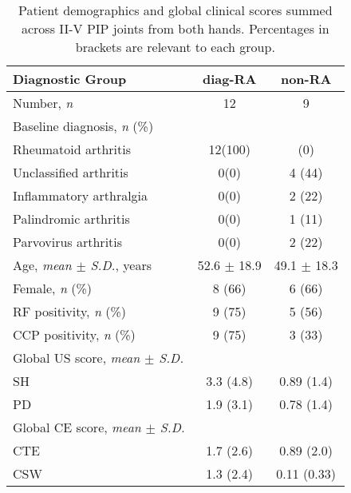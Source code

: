 \documentclass[twoside]{bhamthesis}
\theoremstyle{definition}
\begin{document}
\bgroup
\def\arraystretch{1.2}
\begin{table}[!ht]
  \footnotesize
\caption{Patient demographics and global clinical scores summed across II-V PIP joints from both hands. Percentages in brackets are relevant to each group.} 
\label{tab:participant_demographics}
\begin{center}       
\begin{tabular}{l c c} 
\hline
\textbf{Diagnostic Group} &\textbf{ diag-RA} & \textbf{non-RA} \\
\hline
Number, \textit{n} & 12 & 9 \\
Baseline diagnosis, \textit{n} (\%) \\
\hspace{3mm} Rheumatoid arthritis & 12\hspace{1mm}(100) & \hspace{1mm} \hspace{1mm}(0) \\
\hspace{3mm} Unclassified arthritis & 0\hspace{1mm}(0) & 4 \hspace{1mm}(44) \\
\hspace{3mm} Inflammatory arthralgia & 0\hspace{1mm}(0) & 2 \hspace{1mm}(22) \\
\hspace{3mm} Palindromic arthritis  & 0\hspace{1mm}(0) & 1 \hspace{1mm}(11) \\
\hspace{3mm} Parvovirus arthritis & 0\hspace{1mm}(0) & 2 \hspace{1mm}(22) \\
 Age, \textit{mean $\pm$ S.D.}, years & \hspace{1mm} 52.6 $\pm$ 18.9 & \hspace{1mm} 49.1 $\pm$ 18.3 \\
Female, \textit{n} (\%) & 8\hspace{1mm} (66) & 6\hspace{1mm} (66)  \\
RF positivity, \textit{n} (\%)& 9 (75) & 5 (56) \\
CCP positivity, \textit{n} (\%) & 9 (75) & 3 (33)  \\
Global US score, \textit{ mean $\pm$ S.D.} &  & \\
\hspace{3mm} SH & 3.3 (4.8) &  0.89 (1.4) \\
\hspace{3mm} PD & 1.9 (3.1) & 0.78 (1.4) \\
Global CE score, \textit{ mean $\pm$ S.D.} &  &  \\
\hspace{3mm} CTE & 1.7 (2.6) & 0.89 (2.0) \\
\hspace{3mm} CSW & 1.3 (2.4) & 0.11 (0.33) \\
\hline
\end{tabular}
\end{center}
\end{table}
\end{document}
